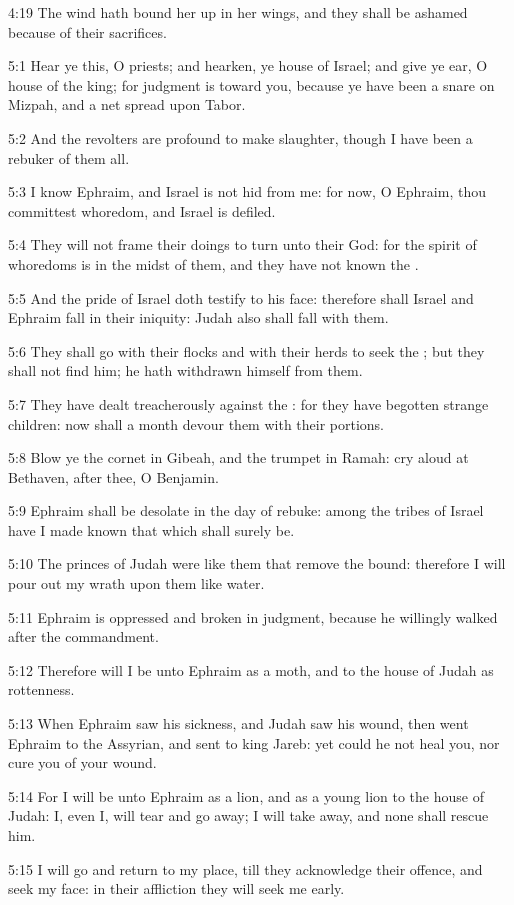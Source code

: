 4:19 The wind hath bound her up in her wings, and they shall be ashamed because of their sacrifices.

5:1 Hear ye this, O priests; and hearken, ye house of Israel; and give ye ear, O house of the king; for judgment is toward you, because ye have been a snare on Mizpah, and a net spread upon Tabor.

5:2 And the revolters are profound to make slaughter, though I have been a rebuker of them all.

5:3 I know Ephraim, and Israel is not hid from me: for now, O Ephraim, thou committest whoredom, and Israel is defiled.

5:4 They will not frame their doings to turn unto their God: for the spirit of whoredoms is in the midst of them, and they have not known the \LORD.

5:5 And the pride of Israel doth testify to his face: therefore shall Israel and Ephraim fall in their iniquity: Judah also shall fall with them.

5:6 They shall go with their flocks and with their herds to seek the \LORD; but they shall not find him; he hath withdrawn himself from them.

5:7 They have dealt treacherously against the \LORD: for they have begotten strange children: now shall a month devour them with their portions.

5:8 Blow ye the cornet in Gibeah, and the trumpet in Ramah: cry aloud at Bethaven, after thee, O Benjamin.

5:9 Ephraim shall be desolate in the day of rebuke: among the tribes of Israel have I made known that which shall surely be.

5:10 The princes of Judah were like them that remove the bound: therefore I will pour out my wrath upon them like water.

5:11 Ephraim is oppressed and broken in judgment, because he willingly walked after the commandment.

5:12 Therefore will I be unto Ephraim as a moth, and to the house of Judah as rottenness.

5:13 When Ephraim saw his sickness, and Judah saw his wound, then went Ephraim to the Assyrian, and sent to king Jareb: yet could he not heal you, nor cure you of your wound.

5:14 For I will be unto Ephraim as a lion, and as a young lion to the house of Judah: I, even I, will tear and go away; I will take away, and none shall rescue him.

5:15 I will go and return to my place, till they acknowledge their offence, and seek my face: in their affliction they will seek me early.

